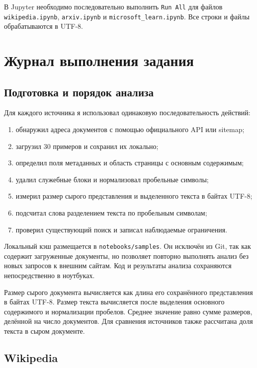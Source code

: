 \documentclass[pdf,unicode,12pt,a4paper,oneside,fleqn]{article}
\begin{document}
В Jupyter необходимо последовательно выполнить \texttt{Run All} для файлов
\texttt{wikipedia.ipynb}, \texttt{arxiv.ipynb} и
\texttt{microsoft\_learn.ipynb}. Все строки и файлы обрабатываются в UTF-8.

\section{Журнал выполнения задания}

\subsection{Подготовка и порядок анализа}

Для каждого источника я использовал одинаковую последовательность действий:

\begin{enumerate}
    \item обнаружил адреса документов с помощью официального API или sitemap;
    \item загрузил 30 примеров и сохранил их локально;
    \item определил поля метаданных и область страницы с основным содержимым;
    \item удалил служебные блоки и нормализовал пробельные символы;
    \item измерил размер сырого представления и выделенного текста в байтах UTF-8;
    \item подсчитал слова разделением текста по пробельным символам;
    \item проверил существующий поиск и записал наблюдаемые ограничения.
\end{enumerate}

Локальный кэш размещается в \texttt{notebooks/samples}. Он исключён из Git, так
как содержит загруженные документы, но позволяет повторно выполнять анализ без
новых запросов к внешним сайтам. Код и результаты анализа сохраняются
непосредственно в ноутбуках.

Размер сырого документа вычисляется как длина его сохранённого представления в
байтах UTF-8. Размер текста вычисляется после выделения основного содержимого и
нормализации пробелов. Среднее значение равно сумме размеров, делённой на число
документов. Для сравнения источников также рассчитана доля текста в сыром
документе.

\subsection{Wikipedia}
\end{document}
